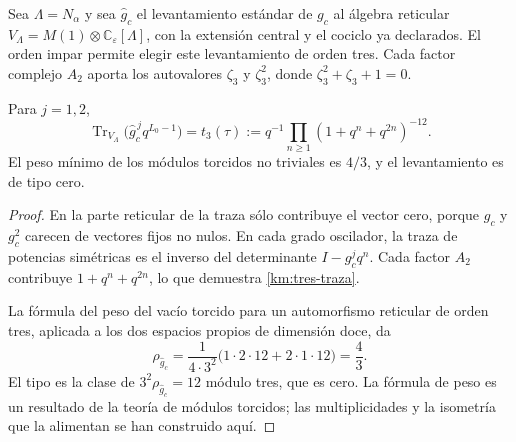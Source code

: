Sea \(\Lambda=N_\alpha\) y sea \(\widehat g_c\) el levantamiento
estándar de \(g_c\) al álgebra reticular
\(V_\Lambda=M(1)\otimes\mathbb C_\varepsilon[\Lambda]\), con la
extensión central y el cociclo ya declarados. El orden impar permite
elegir este levantamiento de orden tres. Cada factor complejo \(A_2\)
aporta los autovalores \(\zeta_3\) y \(\zeta_3^2\), donde
\(\zeta_3^2+\zeta_3+1=0\).

\begin{proposition}
\label{km:traza-tipo}
Para \(j=1,2\),
\begin{equation}
 \operatorname{Tr}_{V_\Lambda}
       \bigl(\widehat g_c^{\,j}q^{L_0-1}\bigr)
 =t_3(\tau)
 :=q^{-1}\prod_{n\ge1}(1+q^n+q^{2n})^{-12}.
 \label{km:tres-traza}
\end{equation}
El peso mínimo de los módulos torcidos no triviales es \(4/3\), y
el levantamiento es de tipo cero.
\end{proposition}
\begin{proof}
En la parte reticular de la traza sólo contribuye el vector cero,
porque \(g_c\) y \(g_c^2\) carecen de vectores fijos no nulos.
En cada grado oscilador, la traza de potencias simétricas es el inverso
del determinante \(I-g_c^jq^n\). Cada factor \(A_2\) contribuye
\(1+q^n+q^{2n}\), lo que demuestra \eqref{km:tres-traza}.

La fórmula del peso del vacío torcido para un automorfismo reticular de
orden tres, aplicada a los dos espacios propios de dimensión doce, da
\[
 \rho_{\widehat g_c}
 =\frac{1}{4\cdot3^2}
   \bigl(1\cdot2\cdot12+2\cdot1\cdot12\bigr)=\frac43.
\]
El tipo es la clase de \(3^2\rho_{\widehat g_c}=12\) módulo
tres, que es cero. La fórmula de peso es un resultado de la teoría de
módulos torcidos; las multiplicidades y la isometría que la alimentan
se han construido aquí.
\end{proof}

